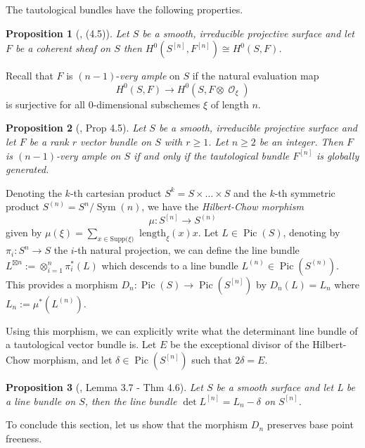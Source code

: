 \documentclass{article}
\DeclareMathOperator{\cO}{\mathcal{O}}
\DeclareMathOperator{\Sym}{Sym}
\DeclareMathOperator{\Pic}{Pic}
\newcommand{\hilb}[2][n]{#2^{[#1]}}
\newcommand{\sym}[2][n]{#2^{(#1)}}
\newtheorem{proposition}{Proposition}[section]
\begin{document}
The tautological bundles have the following properties.

\begin{proposition}[\cite{bini2022familiesbigstablebundles}, (4.5)]\label{prop_zeroth_cohom_F^[n]}
Let $S$ be a smooth, irreducible projective surface and let $F$ be a coherent sheaf on $S$ then $H^0(\hilb{S},\hilb{F})\cong H^0(S,F)$.
\end{proposition}

Recall that $F$ is $(n-1)$-\emph{very ample} on $S$ if the natural evaluation map $$H^0(S,F)\to H^0(S,F\otimes \cO_\xi)$$ is surjective for all $0$-dimensional subschemes $\xi$ of length $n$.

\begin{proposition}[\cite{bini2022familiesbigstablebundles}, Prop 4.5]\label{prop_tautological_globally_generated}
Let $S$ be a smooth, irreducible projective surface and let $F$ be a rank $r$ vector bundle on $S$ with $r\geq 1$. Let $n\geq 2$ be an integer. Then $F$ is $(n-1)$-very ample on $S$ if and only if the tautological bundle $\hilb{F}$ is globally generated.
\end{proposition}

Denoting the $k$-th cartesian product $S^k=S\times\dots\times S$ and the $k$-th symmetric product $\sym{S}=S^n/\Sym(n)$, we have the \emph{Hilbert-Chow morphism} $$\mu:\hilb{S}\to\sym{S}$$ given by $\mu(\xi)=\sum_{x\in\text{Supp($\xi$)}}\text{ length}_\xi(x)x$.
Let $L\in \Pic(S)$, denoting by $\pi_i:S^n\to S$ the $i$-th natural projection, we can define the line bundle $L^{\boxtimes n}:=\otimes_{i=1}^n\pi^*_i(L)$ which descends to a line bundle $\sym{L}\in\Pic(\sym{S})$. This provides a morphism $D_n:\Pic(S)\to \Pic(\hilb{S})$ by $D_n(L)=L_n$ where $L_n:=\mu^*(\sym{L})$.    

Using this morphism, we can explicitly write what the determinant line bundle of a tautological vector bundle is. Let $E$ be the exceptional divisor of the Hilbert-Chow morphism, and let $\delta\in  \Pic(\hilb{S})$ such that $2\delta=E$.

\begin{proposition}[\cite{Lehn_1999}, Lemma 3.7 - Thm 4.6]\label{prop_det_of_tautological}
    Let $S$ be a smooth surface and let L be a line bundle on $S$, then the line bundle $\det \hilb{L}=L_n-\delta$ on $\hilb{S}$.
\end{proposition}

To conclude this section, let us show that the morphism $D_n$ preserves base point freeness.
\end{document}
